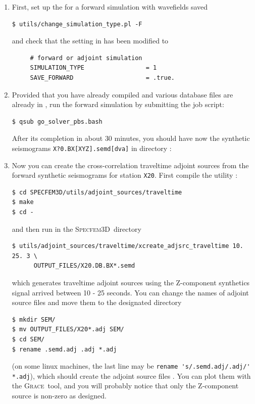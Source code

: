 \documentclass[10pt,fleqn,letterpaper]{article}
\newcommand{\specfem}{\textsc{Specfem3D}}
\newcommand{\grace}{\textsc{Grace}}
\begin{document}
\begin{enumerate}


\item  First, set up the  for a forward simulation with wavefields saved

\begin{lstlisting}
$ utils/change_simulation_type.pl -F
\end{lstlisting}
and check that the setting in  has been modified to
\begin{lstlisting}
     # forward or adjoint simulation
     SIMULATION_TYPE                 = 1
     SAVE_FORWARD                    = .true.
\end{lstlisting}


\item Provided that you have already compiled  and various database files are already in ,
  run the forward simulation by submitting the job script:

\begin{lstlisting}
$ qsub go_solver_pbs.bash
\end{lstlisting}

After its completion in about $30$ minutes,  you should have now the synthetic seismograms \texttt{X?0.BX[XYZ].semd[dva]} in directory :


\item Now you can create the cross-correlation traveltime adjoint sources from the forward synthetic seismograms for station \verb+X20+. First compile the utility :

\begin{lstlisting}
$ cd SPECFEM3D/utils/adjoint_sources/traveltime
$ make
$ cd -
\end{lstlisting}
and then run in the \specfem\ directory
\begin{lstlisting}
$ utils/adjoint_sources/traveltime/xcreate_adjsrc_traveltime 10. 25. 3 \
      OUTPUT_FILES/X20.DB.BX*.semd
\end{lstlisting}
which generates traveltime adjoint sources  using the Z-component synthetics signal arrived between 10 - 25 seconds. You can  change the names of adjoint source files and move them to the designated directory
\begin{lstlisting}
$ mkdir SEM/
$ mv OUTPUT_FILES/X20*.adj SEM/
$ cd SEM/
$ rename .semd.adj .adj *.adj
\end{lstlisting}
(on some linux machines, the last line may be \lstinline{rename 's/.semd.adj/.adj/' *.adj}), which  should create the adjoint source files . You can plot them with the \grace\ tool, and you will probably notice that only the Z-component source is non-zero as designed.



\end{enumerate}
\end{document}
